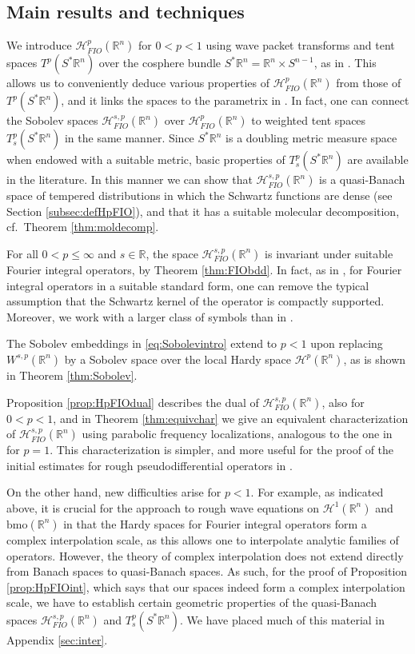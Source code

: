 \documentclass{amsart}
\newcommand {\bmo}{\mathrm{bmo}}
\newcommand {\HT}{\mathcal{H}}
\newcommand {\Hp}{\mathcal{H}^{p}_{FIO}(\Rn)}
\newcommand {\Hps}{\mathcal{H}^{s,p}_{FIO}(\Rn)}
\newcommand {\R}{\mathbb R}
\newcommand {\Rn}{\mathbb{R}^{n}}
\newcommand {\Sp}{S^{*}\Rn}
\theoremstyle{definition}
\numberwithin{equation}{section}
\begin{document}
\subsection{Main results and techniques}

We introduce $\Hp$ for $0<p<1$ using wave packet transforms and tent spaces $T^{p}(\Sp)$ over the cosphere bundle $\Sp=\Rn\times S^{n-1}$, as in \cite{HaPoRo20}. This allows us to conveniently deduce various properties of $\Hp$ from those of $T^{p}(\Sp)$, and it links the spaces to the parametrix %
in \cite{Hassell-Rozendaal23}. In fact, one can connect the Sobolev spaces $\Hps$ over $\Hp$ to weighted tent spaces $T^{p}_{s}(\Sp)$ in the same manner. Since $\Sp$ is a doubling metric measure space when endowed with a suitable metric, basic properties of $T^{p}_{s}(\Sp)$ are available in the literature. In this manner we can show that $\Hps$ is a quasi-Banach space of tempered distributions in which the Schwartz functions are dense (see Section \ref{subsec:defHpFIO}), and that it has a suitable molecular decomposition, cf.~Theorem \ref{thm:moldecomp}. 

For all $0<p\leq \infty$ and $s\in\R$, the space $\Hps$ is invariant under suitable 
Fourier integral operators, by Theorem \ref{thm:FIObdd}. In fact, as in \cite{HaPoRo20}, for Fourier integral operators in a suitable standard form, one can remove the typical assumption that the Schwartz kernel of the operator is compactly supported. Moreover, we work with a larger class of symbols than in \cite{SeSoSt91}. 

The Sobolev embeddings in \eqref{eq:Sobolevintro} extend to $p<1$ upon replacing $W^{s,p}(\Rn)$ by a Sobolev space over the local Hardy space $\HT^{p}(\Rn)$, as is shown in Theorem \ref{thm:Sobolev}. 

Proposition \ref{prop:HpFIOdual} describes the dual of $\Hps$, also for $0<p<1$, and in Theorem \ref{thm:equivchar} we give an equivalent characterization of $\Hps$ using parabolic frequency localizations, analogous to the one in \cite{FaLiRoSo23} for $p=1$. This characterization is simpler, and more useful for the proof of the initial estimates for rough pseudodifferential operators in \cite{LiRoSo25a}. 

On the other hand, new difficulties arise for $p<1$. For example, as indicated above, it is crucial for the approach to rough wave equations on $\HT^{1}(\Rn)$ and $\bmo(\Rn)$ in \cite{LiRoSo25a} that the Hardy spaces for Fourier integral operators form a complex interpolation scale, as this allows one to interpolate analytic families of operators. However, the theory of complex interpolation does not extend directly from Banach spaces to quasi-Banach spaces. As such, for the proof of Proposition \ref{prop:HpFIOint}, which says that our spaces indeed form a complex interpolation scale, we have to establish certain geometric properties of the quasi-Banach spaces $\Hps$ and $T^{p}_{s}(\Sp)$. We have placed much of this material in Appendix \ref{sec:inter}.
\end{document}
